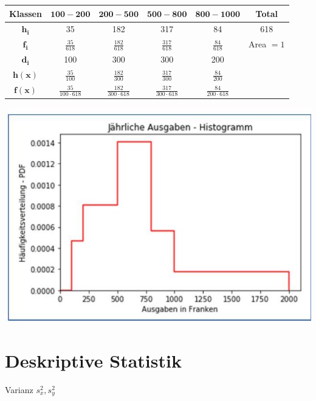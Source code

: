 \documentclass[10pt]{article}
\begin{document}
\begin{center}
\begin{tabular}{|c|c|c|c|c|c|}
\hline
Klassen & $\mathbf{1 0 0 - 2 0 0}$ & $\mathbf{2 0 0 - 5 0 0}$ & $\mathbf{5 0 0 - \mathbf { 8 0 0 }}$ & $\mathbf{8 0 0 - \mathbf { 1 0 0 0 }}$ & Total \\
\hline
$\boldsymbol{h}_{\boldsymbol{i}}$ & 35 & 182 & 317 & 84 & 618 \\
\hline
$\boldsymbol{f}_{\boldsymbol{i}}$ & $\frac{35}{618}$ & $\frac{182}{618}$ & $\frac{317}{618}$ & $\frac{84}{618}$ & Area $=1$ \\
\hline
$\boldsymbol{d}_{\boldsymbol{i}}$ & 100 & 300 & 300 & 200 &  \\
\hline
$\boldsymbol{h}(\boldsymbol{x})$ & $\frac{35}{100}$ & $\frac{182}{300}$ & $\frac{317}{300}$ & $\frac{84}{200}$ &  \\
\hline
$\boldsymbol{f}(\boldsymbol{x})$ & $\frac{35}{100 \cdot 618}$ & $\frac{182}{300 \cdot 618}$ & $\frac{317}{300 \cdot 618}$ & $\frac{84}{200 \cdot 618}$ &  \\
\hline
\end{tabular}
\end{center}

\begin{center}
\includegraphics[width=\linewidth]{images/2024_12_29_e932069dd64ad17e4875g-02(1)}
\end{center}

\section*{Deskriptive Statistik}
Varianz $s_{x}^{2}, s_{y}^{2}$
\end{document}
